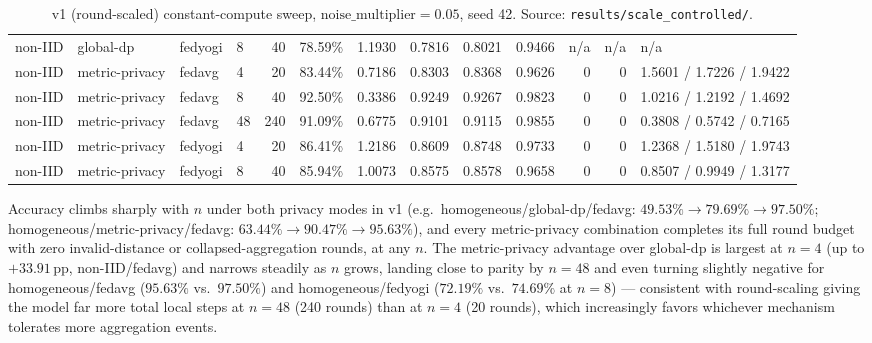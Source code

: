 \documentclass[11pt]{article}
\newcommand{\code}[1]{\texttt{#1}}
\newcommand{\pp}{\,\text{pp}}
\begin{document}
\begin{table}[h]
{\begin{tabular}{llllrrrrrrrrl}
non-IID     & global-dp      & fedyogi & 8  & 40  & 78.59\% & 1.1930 & 0.7816 & 0.8021 & 0.9466 & n/a & n/a & n/a \\
non-IID     & metric-privacy & fedavg  & 4  & 20  & 83.44\% & 0.7186 & 0.8303 & 0.8368 & 0.9626 & 0 & 0 & 1.5601 / 1.7226 / 1.9422 \\
non-IID     & metric-privacy & fedavg  & 8  & 40  & 92.50\% & 0.3386 & 0.9249 & 0.9267 & 0.9823 & 0 & 0 & 1.0216 / 1.2192 / 1.4692 \\
non-IID     & metric-privacy & fedavg  & 48 & 240 & 91.09\% & 0.6775 & 0.9101 & 0.9115 & 0.9855 & 0 & 0 & 0.3808 / 0.5742 / 0.7165 \\
non-IID     & metric-privacy & fedyogi & 4  & 20  & 86.41\% & 1.2186 & 0.8609 & 0.8748 & 0.9733 & 0 & 0 & 1.2368 / 1.5180 / 1.9743 \\
non-IID     & metric-privacy & fedyogi & 8  & 40  & 85.94\% & 1.0073 & 0.8575 & 0.8578 & 0.9658 & 0 & 0 & 0.8507 / 0.9949 / 1.3177 \\
\bottomrule
\end{tabular}%
}
\caption{v1 (round-scaled) constant-compute sweep, $\text{noise\_multiplier}=0.05$, seed 42.
Source: \code{results/scale\_controlled/}.}
\label{tab:v1}
\end{table}

\noindent
Accuracy climbs sharply with $n$ under both privacy modes in v1 (e.g.\ homogeneous/global-dp/fedavg:
$49.53\% \to 79.69\% \to 97.50\%$; homogeneous/metric-privacy/fedavg: $63.44\% \to 90.47\% \to
95.63\%$), and every metric-privacy combination completes its full round budget with zero
invalid-distance or collapsed-aggregation rounds, at any $n$. The metric-privacy advantage over
global-dp is largest at $n{=}4$ (up to $+33.91\pp$, non-IID/fedavg) and narrows steadily as $n$
grows, landing close to parity by $n{=}48$ and even turning slightly negative for
homogeneous/fedavg ($95.63\%$ vs.\ $97.50\%$) and homogeneous/fedyogi ($72.19\%$ vs.\ $74.69\%$ at
$n{=}8$) --- consistent with round-scaling giving the model far more total local steps at $n{=}48$
(240 rounds) than at $n{=}4$ (20 rounds), which increasingly favors whichever mechanism tolerates
more aggregation events.
\end{document}
